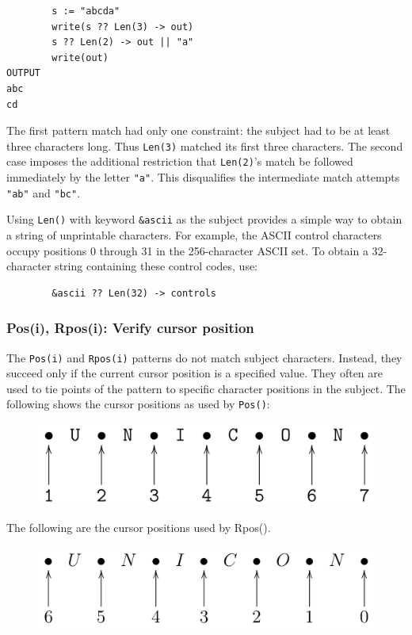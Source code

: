 \documentclass[letterpaper,12pt]{article}
\begin{document}
\begin{verbatim}
        s := "abcda"
        write(s ?? Len(3) -> out)
        s ?? Len(2) -> out || "a"
        write(out)
OUTPUT
abc
cd
\end{verbatim}

The first pattern match had only one constraint: the subject had
to be at least three characters long. Thus {\tt Len(3)} matched its first
three characters. The second case imposes the additional restriction
that {\tt Len(2)}'s match be followed immediately by the letter
{\tt "a"}. This disqualifies the intermediate match attempts
{\tt "ab"} and {\tt "bc"}.

Using {\tt Len()} with keyword {\tt \&ascii} as the subject provides a
simple way to obtain a string of unprintable characters. For example,
the ASCII control characters occupy positions 0 through 31 in the
256-character ASCII set. To obtain a 32-character string containing
these control codes, use:

\begin{verbatim}
        &ascii ?? Len(32) -> controls
\end{verbatim}

\subsubsection{Pos(i), Rpos(i): Verify cursor position}

The {\tt Pos(i)} and {\tt Rpos(i)} patterns do not match subject
characters. Instead, they succeed only if the current cursor position
is a specified value. They often are used to tie points of the pattern
to specific character positions in the subject. The following shows
the cursor positions as used by {\tt Pos()}:

\begin{figure}[h]
\centering
\includegraphics[width=5in]{poscurs.png}
\end{figure}

\pagebreak

The following are the cursor positions used by Rpos().

\begin{figure}[h]
\centering
\includegraphics[width=5in]{rposcurs.png}
\end{figure}
\end{document}
